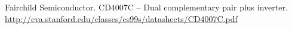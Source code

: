 \documentclass[journal]{IEEEtran}
\begin{document}
%	
%




%	




\begin{thebibliography}{1}

Fairchild Semiconductor. CD4007C -- Dual complementary pair plus inverter. \url{http://cva.stanford.edu/classes/cs99s/datasheets/CD4007C.pdf}



\end{thebibliography}



%	
%
\end{document}
